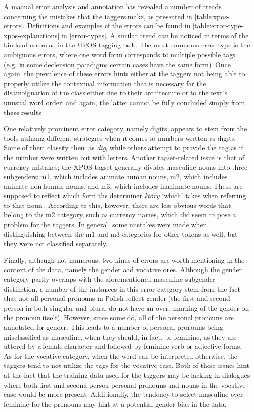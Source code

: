 A manual error analysis and annotation has revealed a number of trends concerning the mistakes that the taggers make, as presented in \autoref{table:xpos-errors}. Definitions and examples of the errors can be found in \autoref{table:error-type-xpos-explanations} in \autoref{error-types}. A similar trend can be noticed in terms of the kinds of errors as in the UPOS-tagging task. The most numerous error type is the ambiguous errors, where one word form corresponds to multiple possible tags (e.g. in some declension paradigms certain cases have the same form). Once again, the prevalence of these errors hints either at the taggers not being able to properly utilize the contextual information that is necessary for the disambiguation of the class either due to their architecture or to the text's unusual word order; and again, the latter cannot be fully concluded simply from these results. 

One relatively prominent error category, namely digits, appears to stem from the tools utilizing different strategies when it comes to numbers written as digits. Some of them classify them as \textit{dig}, while others attempt to provide the tag as if the number were written out with letters. Another tagset-related issue is that of currency mistakes; the XPOS tagset generally divides masculine nouns into three subgenders: m1, which includes animate human nouns, m2, which includes animate non-human nouns, and m3, which includes inanimate nouns. These are supposed to reflect which form the determiner \textit{który} `which' takes when referring to that noun \citep{ud-masculine-gender}. According to this, however, there are less obvious words that belong to the m2 category, such as currency names, which did seem to pose a problem for the taggers. In general, some mistakes were made when distinguishing between the m1 and m3 categories for other tokens as well, but they were not classified separately.

Finally, although not numerous, two kinds of errors are worth mentioning in the context of the data, namely the gender and vocative ones. Although the gender category partly overlaps with the aforementioned masculine subgender distinction, a number of the instances in this error category stem from the fact that not all personal pronouns in Polish reflect gender (the first and second person in both singular and plural do not have an overt marking of the gender on the pronoun itself). However, since some do, all of the personal pronouns are annotated for gender. This leads to a number of personal pronouns being misclassified as masculine, when they should, in fact, be feminine, as they are uttered by a female character and followed by feminine verb or adjective forms. As for the vocative category, when the word can be interpreted otherwise, the taggers tend to not utilize the tags for the vocative case. Both of these issues hint at the fact that the training data used for the taggers may be lacking in dialogues where both first and second-person personal pronouns and nouns in the vocative case would be more present. Additionally, the tendency to select masculine over feminine for the pronouns may hint at a potential gender bias in the data.

